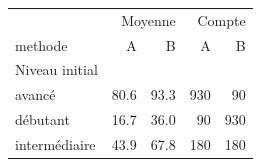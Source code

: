 \begin{tabular}{lrrrr}
\toprule
 & \multicolumn{2}{r}{Moyenne} & \multicolumn{2}{r}{Compte} \\
methode & A & B & A & B \\
Niveau initial &  &  &  &  \\
\midrule
avancé & 80.6 & 93.3 & 930 & 90 \\
débutant & 16.7 & 36.0 & 90 & 930 \\
intermédiaire & 43.9 & 67.8 & 180 & 180 \\
\bottomrule
\end{tabular}

